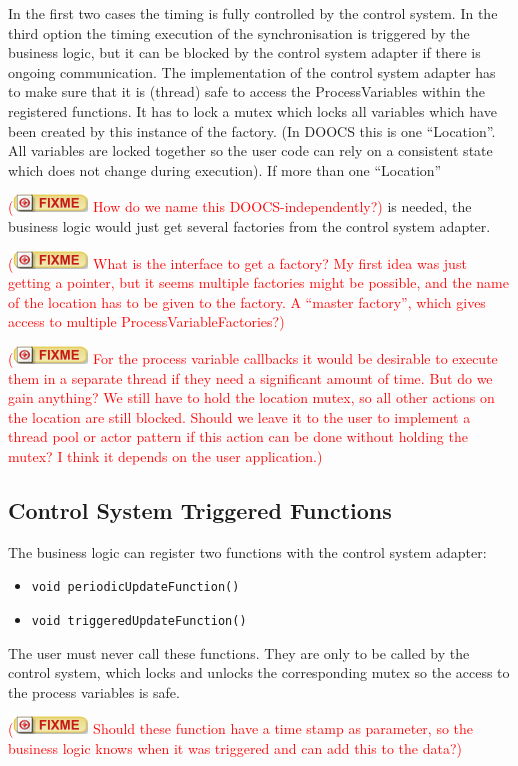 \documentclass[11pt,a4paper]{scrartcl}
\newcounter{nFixmes}
\newcommand{\fixme}[1]{\addtocounter{nFixmes}{1}\textcolor{red}{(\includegraphics[height=2ex]{fixme} #1)}\xspace}
\begin{document}
In the first two cases the timing is fully controlled by the control system.
In the third option the timing execution of the synchronisation is triggered by
the business logic, but it can be blocked by the control system adapter if there is
ongoing communication. The
implementation of the control system adapter has to make sure that it is (thread)
safe to access the ProcessVariables within the registered functions. It has to lock 
a mutex which locks all variables which have been created by this instance of the factory.
(In DOOCS this is one ``Location''. All variables are locked together so the user code
can rely on a consistent state which does not change during execution).
If more than one ``Location'' \fixme{How do we name this DOOCS-independently?} is needed,
the business logic would just get several factories from the control system adapter.

\fixme{What is the interface to get a factory? My first idea was just getting a pointer, but it
seems multiple factories might be possible, and the name of the location has to be given to the
factory. A ``master factory'', which gives access to multiple ProcessVariableFactories?}

\fixme{For the process variable callbacks it would be desirable to execute them in a separate
  thread if they need a significant amount of time. But do we gain anything? We still have to
  hold the location mutex, so all other actions on the location are still blocked.
  Should we leave it to the user to implement a thread pool or actor pattern if this action can be
  done without holding the mutex? I think it depends on the user application.}

\subsection{Control System Triggered Functions}
The business logic can register two functions with the control system adapter:
\begin{itemize}
  \item \texttt{void periodicUpdateFunction()}
  \item \texttt{void triggeredUpdateFunction()}
\end{itemize}
The user must never call these functions. They are only to be called by
the control system, which locks and unlocks the corresponding mutex so 
the access to the process variables is safe.

\fixme{Should these function have a time stamp as parameter, so the business logic knows when it was
triggered and can add this to the data?}
\end{document}

